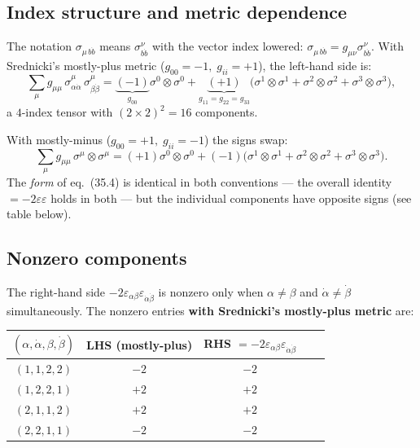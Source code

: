 \subsection{Index structure and metric dependence}

The notation $\sigma_{\mu\,b\dot{b}}$ means $\sigma^\nu_{b\dot{b}}$ with
the vector index lowered: $\sigma_{\mu\,b\dot{b}} = g_{\mu\nu}\sigma^\nu_{b\dot{b}}$.
With Srednicki's mostly-plus metric ($g_{00}=-1,\; g_{ii}=+1$), the left-hand side is:
\[
  \sum_\mu g_{\mu\mu}\,\sigma^\mu_{\alpha\dot{\alpha}}\,\sigma^\mu_{\beta\dot{\beta}}
  = \underbrace{(-1)}_{{g_{00}}}\sigma^0\!\otimes\!\sigma^0
    + \underbrace{(+1)}_{{g_{11}=g_{22}=g_{33}}}\bigl(\sigma^1\!\otimes\!\sigma^1
    + \sigma^2\!\otimes\!\sigma^2
    + \sigma^3\!\otimes\!\sigma^3\bigr),
\]
a $4$-index tensor with $(2\times2)^2 = 16$ components.

\begin{metricnote}
With mostly-minus ($g_{00}=+1,\; g_{ii}=-1$) the signs swap:
\[
  \sum_\mu g_{\mu\mu}\,\sigma^\mu\!\otimes\!\sigma^\mu
  = (+1)\sigma^0\!\otimes\!\sigma^0
    + (-1)\bigl(\sigma^1\!\otimes\!\sigma^1
    + \sigma^2\!\otimes\!\sigma^2
    + \sigma^3\!\otimes\!\sigma^3\bigr).
\]
The \emph{form} of eq.~(35.4) is identical in both conventions --- the
overall identity $= -2\varepsilon\varepsilon$ holds in both --- but the
individual components have opposite signs (see table below).
\end{metricnote}

\subsection{Nonzero components}

The right-hand side $-2\varepsilon_{\alpha\beta}\varepsilon_{\dot\alpha\dot\beta}$
is nonzero only when $\alpha\neq\beta$ and $\dot\alpha\neq\dot\beta$
simultaneously.  The nonzero entries \textbf{with Srednicki's mostly-plus
metric} are:

\medskip
\begin{center}
\begin{tabular}{@{}ccccc@{}}
  \toprule
  $(\alpha,\dot\alpha,\beta,\dot\beta)$ &
  LHS (mostly-plus) & RHS $= -2\varepsilon_{\alpha\beta}\varepsilon_{\dot\alpha\dot\beta}$ \\
  \midrule
  $(1,1,2,2)$ & $-2$ & $-2$ \\
  $(1,2,2,1)$ & $+2$ & $+2$ \\
  $(2,1,1,2)$ & $+2$ & $+2$ \\
  $(2,2,1,1)$ & $-2$ & $-2$ \\
  \bottomrule
\end{tabular}
\end{center}

